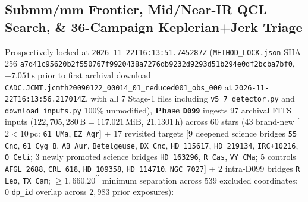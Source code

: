 \documentclass[twocolumn,10pt]{article}
\begin{document}
\subsection{Submm/mm Frontier, Mid/Near-IR QCL Search, \& 36-Campaign Keplerian+Jerk Triage}
Prospectively locked at \texttt{2026-11-22T16:13:51.745287Z} (\texttt{METHOD\_LOCK.json} SHA-256 \texttt{a7d41c95\allowbreak 620b2f55\allowbreak 0767f992\allowbreak 0438a727\allowbreak 6db9232d\allowbreak 9293d51b\allowbreak 294e0df2\allowbreak bcba7bf0}, $+7.051\,\text{s}$ prior to first archival download \texttt{CADC.JCMT.jcmth20090122\_00014\_01\_reduced001\_obs\_000} at \texttt{2026-11-22T16:13:56.217014Z}, with all 7 Stage-1 files including \texttt{v5\_7\_detector.py} and \texttt{download\_inputs.py} 100\% unmodified), \textbf{Phase \texttt{D099}} ingests $97$ archival FITS inputs ($122{,}705{,}280\,\text{B} = 117.021\,\text{MiB}$, $21.1301\,\text{h}$) across $60$ stars ($43$ brand-new [$2 < 10\,\text{pc}$: \texttt{61\,UMa}, \texttt{EZ\,Aqr}] + $17$ revisited targets [$9$ deepened science bridges \texttt{55\,Cnc}, \texttt{61\,Cyg\,B}, \texttt{AB\,Aur}, \texttt{Betelgeuse}, \texttt{DX\,Cnc}, \texttt{HD\,115617}, \texttt{HD\,219134}, \texttt{IRC+10216}, \texttt{O\,Ceti}; $3$ newly promoted science bridges \texttt{HD\,163296}, \texttt{R\,Cas}, \texttt{VY\,CMa}; $5$ controls \texttt{AFGL\,2688}, \texttt{CRL\,618}, \texttt{HD\,109358}, \texttt{HD\,114710}, \texttt{NGC\,7027}] + $2$ intra-D099 bridges \texttt{R\,Leo}, \texttt{TX\,Cam}; $\ge 1{,}660.20^{\prime\prime}$ minimum separation across $539$ excluded coordinates; $0$ \texttt{dp\_id} overlap across $2{,}983$ prior exposures):
\end{document}
